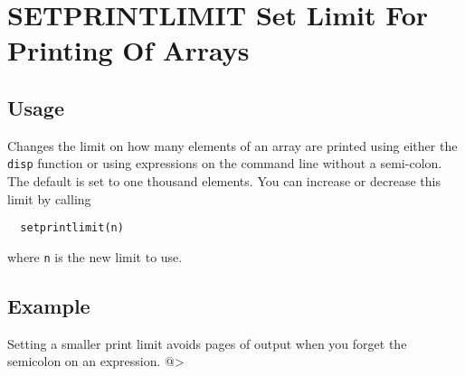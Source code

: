\section{SETPRINTLIMIT Set Limit For Printing Of Arrays}

\subsection{Usage}

Changes the limit on how many elements of an array are printed
using either the \verb|disp| function or using expressions on the
command line without a semi-colon.  The default is set to 
one thousand elements.  You can increase or decrease this
limit by calling
\begin{verbatim}
  setprintlimit(n)
\end{verbatim}
where \verb|n| is the new limit to use.
\subsection{Example}

Setting a smaller print limit avoids pages of output when you forget the semicolon on an expression.
@>
